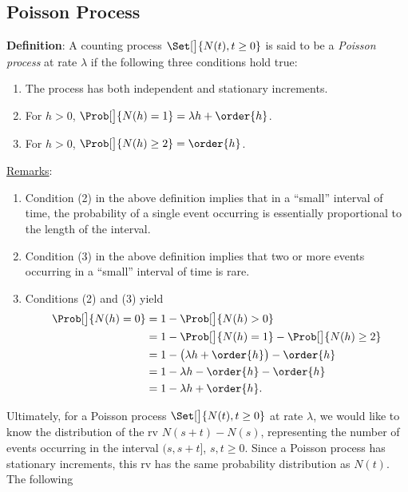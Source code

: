 \subsection*{Poisson Process}
\begin{Regular}
    \textbf{Definition}: A counting process $ \Set[\big]{N(t),t\ge 0} $ is said to be a \emph{Poisson process} at rate $ \lambda $
    if the following three conditions hold true:
    \begin{enumerate}[(1)]
        \item The process has both independent and stationary increments.
        \item For $ h>0 $, $ \Prob[\big]{N(h)=1}=\lambda h+\order{h} $.
        \item For $ h>0 $, $ \Prob[\big]{N(h)\ge 2}=\order{h} $.
    \end{enumerate}
    \tcblower{}
    \underline{Remarks}:
    \begin{enumerate}[(1)]
        \item Condition (2) in the above definition implies that in a ``small'' interval of time, the probability of a single
              event occurring is essentially proportional to the length of the interval.
        \item Condition (3) in the above definition implies that two or more events occurring in a ``small'' interval of time is rare.
        \item Conditions (2) and (3) yield
              \begin{align*}
                  \Prob[\big]{N(h)=0}
                   & =1-\Prob[\big]{N(h)>0}                        \\
                   & =1-\Prob[\big]{N(h)=1}-\Prob[\big]{N(h)\ge 2} \\
                   & =1-\bigl(\lambda h+\order{h}\bigr)-\order{h}  \\
                   & =1-\lambda h-\order{h}-\order{h}              \\
                   & =1-\lambda h+\order{h}.
              \end{align*}
    \end{enumerate}
\end{Regular}
Ultimately, for a Poisson process $ \Set[\big]{N(t),t\ge 0} $ at rate $ \lambda $, we would like to know the distribution of
the rv $ N(s+t)-N(s) $, representing the number of events occurring in the interval $ (s,s+t] $, $ s,t\ge 0 $. Since a Poisson
process has stationary increments, this rv has the same probability distribution as $ N(t) $. The following
